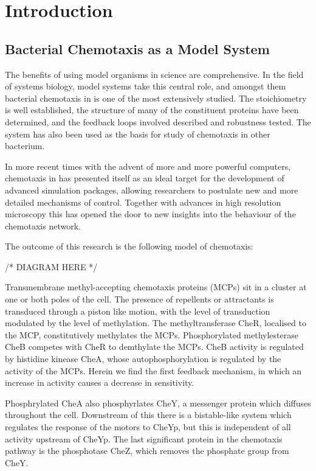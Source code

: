 \documentclass[../main.tex]{subfiles}
\begin{document}
\section{Introduction}

\subsection{Bacterial Chemotaxis as a Model System}
The benefits of using model organisms in science are comprehensive. In the field of systems biology, model systems take this central role, and amongst them bacterial chemotaxis in \ecoli is one of the most extensively studied. The stoichiometry is well established\cite{li04}, the structure of many of the constituent proteins have been determined\cite{milligan87, stock89}, and the feedback loops involved described\cite{kentner09} and robustness tested\cite{yi00}. The \ecoli system has also been used as the basis for study of chemotaxis in other bacterium\cite{hamadeh11}.

In more recent times with the advent of more and more powerful computers, chemotaxis in \ecoli has presented itself as an ideal target for the development of advanced simulation packages, allowing researchers to postulate new and more detailed mechanisms of control\cite{lipkow06}. Together with advances in high resolution microscopy\cite{greenfield09} this has opened the door to new insights into the behaviour of the \ecoli chemotaxis network.

The outcome of this research is the following model of chemotaxis:


/* DIAGRAM HERE */

Transmembrane methyl-accepting chemotaxis proteins (MCPs) sit in a cluster at one or both poles of the cell. The presence of repellents or attractants is transduced through a piston like motion\cite{hall11}, with the level of transduction modulated by the level of methylation. The methyltransferase CheR, localised to the MCP, constitutively methylates the MCPs. Phosphorylated methylesterase CheB competes with CheR to demthylate the MCPs. CheB activity is regulated by histidine kinease CheA, whose autophosphorylation is regulated by the activity of the  MCPs. Herein we find the first feedback mechanism, in which an increase in activity causes a decrease in sensitivity.

Phosphrylated CheA also phosphyrlates CheY, a messenger protein which diffuses throughout the cell. Downstream of this there is a bistable-like system which regulates the response of the motors to CheYp, but this is independent of all activity upstream of CheYp. The last significant protein in the \ecoli chemotaxis pathway is the phosphotase CheZ, which removes the phosphate group from CheY.
\end{document}
